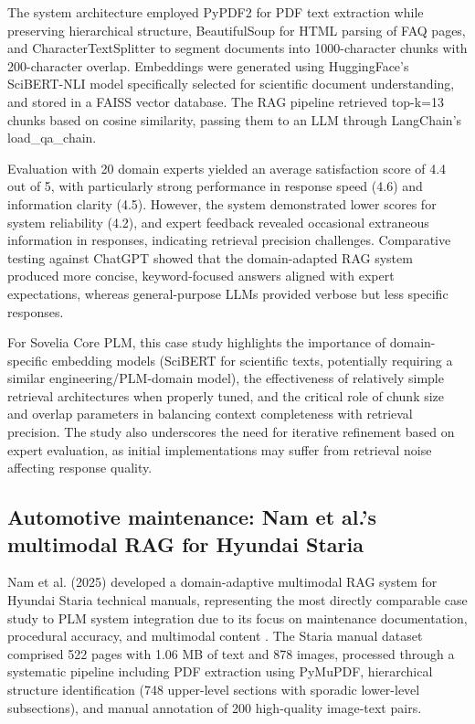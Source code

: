 The system architecture employed PyPDF2 for PDF text extraction while preserving hierarchical structure, BeautifulSoup for HTML parsing of FAQ pages, and CharacterTextSplitter to segment documents into 1000-character chunks with 200-character overlap. Embeddings were generated using HuggingFace's SciBERT-NLI model specifically selected for scientific document understanding, and stored in a FAISS vector database. The RAG pipeline retrieved top-k=13 chunks based on cosine similarity, passing them to an LLM through LangChain's load\_qa\_chain.

Evaluation with 20 domain experts yielded an average satisfaction score of 4.4 out of 5, with particularly strong performance in response speed (4.6) and information clarity (4.5). However, the system demonstrated lower scores for system reliability (4.2), and expert feedback revealed occasional extraneous information in responses, indicating retrieval precision challenges. Comparative testing against ChatGPT showed that the domain-adapted RAG system produced more concise, keyword-focused answers aligned with expert expectations, whereas general-purpose LLMs provided verbose but less specific responses.

For Sovelia Core PLM, this case study highlights the importance of domain-specific embedding models (SciBERT for scientific texts, potentially requiring a similar engineering/PLM-domain model), the effectiveness of relatively simple retrieval architectures when properly tuned, and the critical role of chunk size and overlap parameters in balancing context completeness with retrieval precision. The study also underscores the need for iterative refinement based on expert evaluation, as initial implementations may suffer from retrieval noise affecting response quality.

\subsection{Automotive maintenance: Nam et al.'s multimodal RAG for Hyundai Staria}

Nam et al. (2025) developed a domain-adaptive multimodal RAG system for Hyundai Staria technical manuals, representing the most directly comparable case study to PLM system integration due to its focus on maintenance documentation, procedural accuracy, and multimodal content \parencite{nam_lora-tuned_2025}. The Staria manual dataset comprised 522 pages with 1.06 MB of text and 878 images, processed through a systematic pipeline including PDF extraction using PyMuPDF, hierarchical structure identification (748 upper-level sections with sporadic lower-level subsections), and manual annotation of 200 high-quality image-text pairs.

